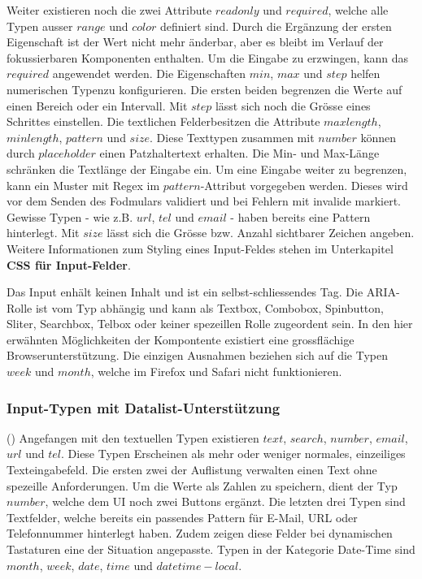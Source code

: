 Weiter existieren noch die zwei Attribute $readonly$ und $required$, welche alle Typen ausser $range$ und $color$ definiert sind.
Durch die Ergänzung der ersten Eigenschaft ist der Wert nicht mehr änderbar, aber es bleibt im Verlauf der fokussierbaren Komponenten enthalten.
Um die Eingabe zu erzwingen, kann das $required$ angewendet werden.
Die Eigenschaften $min$, $max$ und $step$ helfen numerischen Typen\footnotemark zu konfigurieren.
Die ersten beiden begrenzen die Werte auf einen Bereich oder ein Intervall.
Mit $step$ lässt sich noch die Grösse eines Schrittes einstellen.
Die textlichen Felder\footnotemark besitzen die Attribute $maxlength$, $minlength$, $pattern$ und $size$.
Diese Texttypen zusammen mit $number$ können durch $placeholder$ einen Patzhaltertext erhalten.
Die Min- und Max-Länge schränken die Textlänge der Eingabe ein.
Um eine Eingabe weiter zu begrenzen, kann ein Muster mit Regex im $pattern$-Attribut vorgegeben werden.
Dieses wird vor dem Senden des Fodmulars validiert und bei Fehlern mit invalide markiert.
Gewisse Typen - wie z.B. $url$, $tel$ und $email$ - haben bereits eine Pattern hinterlegt.
Mit $size$ lässt sich die Grösse bzw. Anzahl sichtbarer Zeichen angeben.
Weitere Informationen zum Styling eines Input-Feldes stehen im Unterkapitel \textbf{CSS für Input-Felder}.

Das Input enhält keinen Inhalt und ist ein selbst-schliessendes Tag.
Die ARIA-Rolle ist vom Typ abhängig und kann als Textbox, Combobox, Spinbutton, Sliter, Searchbox, Telbox oder keiner spezeillen Rolle zugeordent sein.
In den hier erwähnten Möglichkeiten der Kompontente existiert eine grossflächige Browserunterstützung.
Die einzigen Ausnahmen beziehen sich auf die Typen $week$ und $month$, welche im Firefox und Safari nicht funktionieren.

\subsubsection{{\color{dgray} Input-Typen mit Datalist-Unterstützung}}
(\cite{datalistMdn}) Angefangen mit den textuellen Typen existieren $text$, $search$, $number$, $email$, $url$ und $tel$.
Diese Typen Erscheinen als mehr oder weniger normales, einzeiliges Texteingabefeld.
Die ersten zwei der Auflistung verwalten einen Text ohne spezeille Anforderungen. 
Um die Werte als Zahlen zu speichern, dient der Typ $number$, welche dem UI noch zwei Buttons ergänzt.
Die letzten drei Typen sind Textfelder, welche bereits ein passendes Pattern für E-Mail, URL oder Telefonnummer hinterlegt haben.
Zudem zeigen diese Felder bei dynamischen Tastaturen eine der Situation angepasste\footnotemark.
Typen in der Kategorie Date-Time sind $month$, $week$, $date$, $time$ und $datetime-local$.

